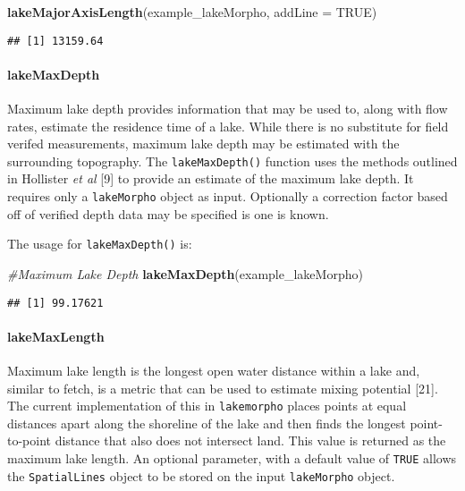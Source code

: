 \documentclass[11pt,]{article}
\newenvironment{Shaded}{\begin{snugshade}}{\end{snugshade}}
\newcommand{\KeywordTok}[1]{\textcolor[rgb]{0.13,0.29,0.53}{\textbf{{#1}}}}
\newcommand{\DataTypeTok}[1]{\textcolor[rgb]{0.13,0.29,0.53}{{#1}}}
\newcommand{\CommentTok}[1]{\textcolor[rgb]{0.56,0.35,0.01}{\textit{{#1}}}}
\newcommand{\OtherTok}[1]{\textcolor[rgb]{0.56,0.35,0.01}{{#1}}}
\newcommand{\NormalTok}[1]{{#1}}
\begin{document}
\begin{Shaded}
\begin{Highlighting}[]
\KeywordTok{lakeMajorAxisLength}\NormalTok{(example_lakeMorpho, }\DataTypeTok{addLine =} \OtherTok{TRUE}\NormalTok{)}
\end{Highlighting}
\end{Shaded}

\begin{verbatim}
## [1] 13159.64
\end{verbatim}

\paragraph{lakeMaxDepth}\label{lakemaxdepth}

Maximum lake depth provides information that may be used to, along with
flow rates, estimate the residence time of a lake. While there is no
substitute for field verifed measurements, maximum lake depth may be
estimated with the surrounding topography. The \texttt{lakeMaxDepth()}
function uses the methods outlined in Hollister \emph{et al} {[}9{]} to
provide an estimate of the maximum lake depth. It requires only a
\texttt{lakeMorpho} object as input. Optionally a correction factor
based off of verified depth data may be specified is one is known.

The usage for \texttt{lakeMaxDepth()} is:

\begin{Shaded}
\begin{Highlighting}[]
\CommentTok{#Maximum Lake Depth}
\KeywordTok{lakeMaxDepth}\NormalTok{(example_lakeMorpho)}
\end{Highlighting}
\end{Shaded}

\begin{verbatim}
## [1] 99.17621
\end{verbatim}

\paragraph{lakeMaxLength}\label{lakemaxlength}

Maximum lake length is the longest open water distance within a lake
and, similar to fetch, is a metric that can be used to estimate mixing
potential {[}21{]}. The current implementation of this in
\texttt{lakemorpho} places points at equal distances apart along the
shoreline of the lake and then finds the longest point-to-point distance
that also does not intersect land. This value is returned as the maximum
lake length. An optional parameter, with a default value of
\texttt{TRUE} allows the \texttt{SpatialLines} object to be stored on
the input \texttt{lakeMorpho} object.
\end{document}
